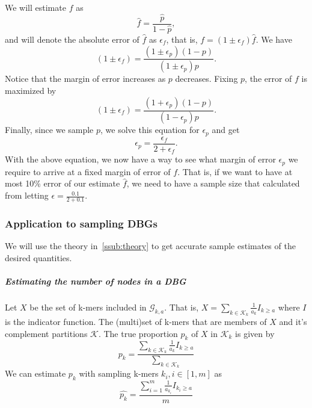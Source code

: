 \documentclass[a4paper,11pt]{article}
\begin{document}
We will estimate $f$ as
\begin{equation*}
 	\hat{f} = \frac{\hat{p}}{1-\hat{p}},
\end{equation*} 
and will denote the absolute error of $\hat{f}$ as $\epsilon_f$, that is, $f = (1 \pm \epsilon_f) \hat{f}$. We have
\begin{equation*}
 	(1\pm \epsilon_f) = \frac{(1\pm \epsilon_p)(1-p)}{(1\pm \epsilon_p)p}. 
 \end{equation*} 
Notice that the margin of error increases as $p$ decreases. Fixing $p$, the error of $f$ is maximized by  
\begin{equation*}
 	(1\pm \epsilon_f) = \frac{(1 + \epsilon_p)(1-p)}{(1- \epsilon_p)p}. 
 \end{equation*} 
 Finally, since we sample $p$, we solve this equation for $\epsilon_p$ and get
\begin{equation}
 	\epsilon_p = \frac{\epsilon_f}{2 + \epsilon_f}. 
 \end{equation}
With the above equation, we now have a way to see what margin of error $\epsilon_p$ we require to arrive at a fixed margin of error of $f$. That is, if we want to have at most 10\% error of our estimate $\hat{f}$, we need to have a sample size that calculated from letting $\epsilon = \frac{0.1}{2 + 0.1}$.



\subsubsection{Application to sampling DBGs} %
\label{sub:application_to_sampling_db_graphs}
We will use the theory in~\ref{ssub:theory} to get accurate sample estimates of the desired quantities. 
\subparagraph{Estimating the number of nodes in a DBG} %
\label{subp:estimating_the_number_of_nodes_in_a_db_graph}
Let $X$ be the set of k-mers included in $\mathcal{G}_{k,a}$. That is, $X = \sum_{k\in \mathcal{K}_k} \frac{1}{a_k}I_{k\geq a}$ where $I$ is the indicator function. The (multi)set of k-mers that are members of $X$ and it's complement partitions $\mathcal{K}$. The true proportion $p_k$ of $X$ in $\mathcal{K}_k$ is given by
\begin{equation}
	p_k = \frac{\sum_{k\in \mathcal{K}_k} \frac{1}{a_k}I_{k\geq a} }{ \sum_{k\in \mathcal{K}_k} }
\end{equation}
 We can estimate $p_k$ with sampling k-mers $k_i, i\in[1,m]$ as
\begin{equation}
	\hat{p_k} = \frac{\sum_{i = 1}^m \frac{1}{a_{k_i}}I_{{k_i}\geq a} } { m}
\end{equation}
\end{document}
